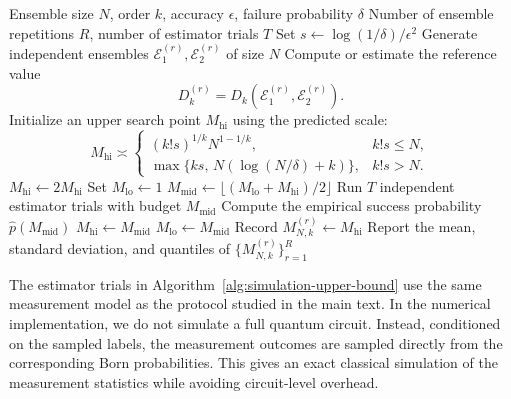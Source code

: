 \documentclass[aps,prx,reprint,superscriptaddress,amsmath,amssymb,longbibliography,floatfix]{revtex4-2}
\theoremstyle{plain}
\theoremstyle{definition}
\theoremstyle{remark}
\begin{document}
\begin{algorithm*}[t]
\caption{Simulation of the sample-complexity upper bound}
\label{alg:simulation-upper-bound}
\begin{algorithmic}[1]
\Require Ensemble size $N$, order $k$, accuracy $\epsilon$, failure probability $\delta$
\Require Number of ensemble repetitions $R$, number of estimator trials $T$
\State Set $s \gets \log(1/\delta)/\epsilon^2$
    \State Generate independent ensembles $\mathcal E_1^{(r)},\mathcal E_2^{(r)}$ of size $N$
    \State Compute or estimate the reference value
    \[
        D_k^{(r)} = D_k(\mathcal E_1^{(r)},\mathcal E_2^{(r)}).
    \]
    \State Initialize an upper search point $M_{\mathrm{hi}}$ using the predicted scale:
    \[
        M_{\mathrm{hi}}
        \asymp
        \begin{cases}
        (k!s)^{1/k}N^{1-1/k},
        & k!s \leq N, \\[3pt]
        \max\{ks,\,N(\log(N/\delta)+k)\},
        & k!s > N .
        \end{cases}
    \]
        \State $M_{\mathrm{hi}} \gets 2M_{\mathrm{hi}}$
    \EndWhile
    \State Set $M_{\mathrm{lo}}\gets 1$
        \State $M_{\mathrm{mid}}\gets \lfloor(M_{\mathrm{lo}}+M_{\mathrm{hi}})/2\rfloor$
        \State Run $T$ independent estimator trials with budget $M_{\mathrm{mid}}$
        \State Compute the empirical success probability $\widehat p(M_{\mathrm{mid}})$
            \State $M_{\mathrm{hi}}\gets M_{\mathrm{mid}}$
        \Else
            \State $M_{\mathrm{lo}}\gets M_{\mathrm{mid}}$
        \EndIf
    \EndWhile
    \State Record $M_{N,k}^{(r)}\gets M_{\mathrm{hi}}$
\EndFor
\State Report the mean, standard deviation, and quantiles of
$\{M_{N,k}^{(r)}\}_{r=1}^R$
\end{algorithmic}
\end{algorithm*}

The estimator trials in Algorithm~\ref{alg:simulation-upper-bound} use the same
measurement model as the protocol studied in the main text.  In the numerical
implementation, we do not simulate a full quantum circuit.  Instead, conditioned
on the sampled labels, the measurement outcomes are sampled directly from the
corresponding Born probabilities.  This gives an exact classical simulation of
the measurement statistics while avoiding circuit-level overhead.
\end{document}
